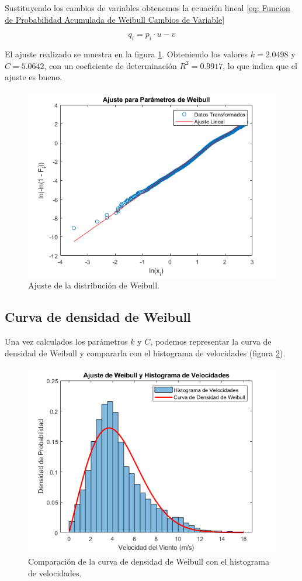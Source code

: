 \documentclass{IEEEtran}
\begin{document}
Sustituyendo los cambios de variables obtenemos la ecuación lineal \ref{eq: Funcion de Probabilidad Acumulada de Weibull Cambios de Variable}

\begin{equation}
    q_i = p_i \cdot u - v
    \label{eq: Funcion de Probabilidad Acumulada de Weibull Cambios de Variable}
\end{equation}

El ajuste realizado se muestra en la figura \ref{fig: Ajuste de la distribución de Weibull}. Obteniendo los valores $k = 2.0498$ y $C = 5.0642$, con un coeficiente de determinación $R^2 = 0.9917$, lo que indica que el ajuste es bueno.

\begin{figure}[h]
    \centering
    \includegraphics[width = 0.5 \textwidth]{Imagenes/Ajuste de Distribucion de Weibull.png}
    \caption{Ajuste de la distribución de Weibull.}
    \label{fig: Ajuste de la distribución de Weibull}
\end{figure}


\subsection{Curva de densidad de Weibull}

Una vez calculados los parámetros $k$ y $C$, podemos representar la curva de densidad de Weibull y compararla con el histograma de velocidades (figura \ref{fig: Curva de densidad de Weibull vs Histograma de velocidades}).

\begin{figure}[h]
    \centering
    \includegraphics[width = 0.5 \textwidth]{Imagenes/Ajuste de Weibull y Histograma de Velocidades.png}
    \caption{Comparación de la curva de densidad de Weibull con el histograma de velocidades.}
    \label{fig: Curva de densidad de Weibull vs Histograma de velocidades}
\end{figure}
\end{document}
